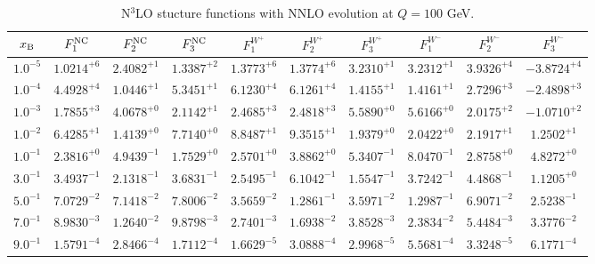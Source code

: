 \begin{table}[h]
\begin{adjustbox}{width=\textwidth}
\begin{tabular}{|c||c|c|c|c|c|c|c|c|c|}
\hline
$x_{\rm B}$ & $F_1^{\rm NC}$ & $F_2^{\rm NC}$ & $F_3^{\rm NC}$ & $F_1^{W^+}$ & $F_2^{W^+}$ & $F_3^{W^+}$ & $F_1^{W^-}$ & $F_2^{W^-}$ & $F_3^{W^-}$ \\
\hline
$ 1.0^{-5}$ & $ 1.0214^{+6}$ & $ 2.4082^{+1}$ & $ 1.3387^{+2}$ & $ 1.3773^{+6}$ & $ 1.3774^{+6}$ & $ 3.2310^{+1}$ & $ 3.2312^{+1}$ & $ 3.9326^{+4}$ & $-3.8724^{+4}$ \\
$ 1.0^{-4}$ & $ 4.4928^{+4}$ & $ 1.0446^{+1}$ & $ 5.3451^{+1}$ & $ 6.1230^{+4}$ & $ 6.1261^{+4}$ & $ 1.4155^{+1}$ & $ 1.4161^{+1}$ & $ 2.7296^{+3}$ & $-2.4898^{+3}$ \\
$ 1.0^{-3}$ & $ 1.7855^{+3}$ & $ 4.0678^{+0}$ & $ 2.1142^{+1}$ & $ 2.4685^{+3}$ & $ 2.4818^{+3}$ & $ 5.5890^{+0}$ & $ 5.6166^{+0}$ & $ 2.0175^{+2}$ & $-1.0710^{+2}$ \\
$ 1.0^{-2}$ & $ 6.4285^{+1}$ & $ 1.4139^{+0}$ & $ 7.7140^{+0}$ & $ 8.8487^{+1}$ & $ 9.3515^{+1}$ & $ 1.9379^{+0}$ & $ 2.0422^{+0}$ & $ 2.1917^{+1}$ & $ 1.2502^{+1}$ \\
$ 1.0^{-1}$ & $ 2.3816^{+0}$ & $ 4.9439^{-1}$ & $ 1.7529^{+0}$ & $ 2.5701^{+0}$ & $ 3.8862^{+0}$ & $ 5.3407^{-1}$ & $ 8.0470^{-1}$ & $ 2.8758^{+0}$ & $ 4.8272^{+0}$ \\
$ 3.0^{-1}$ & $ 3.4937^{-1}$ & $ 2.1318^{-1}$ & $ 3.6831^{-1}$ & $ 2.5495^{-1}$ & $ 6.1042^{-1}$ & $ 1.5547^{-1}$ & $ 3.7242^{-1}$ & $ 4.4868^{-1}$ & $ 1.1205^{+0}$ \\
$ 5.0^{-1}$ & $ 7.0729^{-2}$ & $ 7.1418^{-2}$ & $ 7.8006^{-2}$ & $ 3.5659^{-2}$ & $ 1.2861^{-1}$ & $ 3.5971^{-2}$ & $ 1.2987^{-1}$ & $ 6.9071^{-2}$ & $ 2.5238^{-1}$ \\
$ 7.0^{-1}$ & $ 8.9830^{-3}$ & $ 1.2640^{-2}$ & $ 9.8798^{-3}$ & $ 2.7401^{-3}$ & $ 1.6938^{-2}$ & $ 3.8528^{-3}$ & $ 2.3834^{-2}$ & $ 5.4484^{-3}$ & $ 3.3776^{-2}$ \\
$ 9.0^{-1}$ & $ 1.5791^{-4}$ & $ 2.8466^{-4}$ & $ 1.7112^{-4}$ & $ 1.6629^{-5}$ & $ 3.0888^{-4}$ & $ 2.9968^{-5}$ & $ 5.5681^{-4}$ & $ 3.3248^{-5}$ & $ 6.1771^{-4}$ \\
\hline
\end{tabular}
\end{adjustbox}\caption{N$^{3}$LO stucture functions with NNLO evolution at $Q = 100$ GeV.}
\label{tab:N3LO-Q100}
\end{table}


